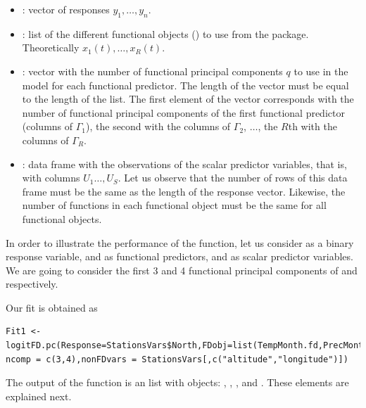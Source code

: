 \begin{itemize} 
\item {}: vector of responses $y_{1},\ldots ,y_{n}.$ 
\item {}: list of the different functional objects () to use from the  package. Theoretically $x_1(t),\ldots,x_R(t).$
\item {}: vector with the number of functional principal components $q$ to use in the model for each functional predictor. The length of the vector must be equal to the length of the  list. The first element of the vector corresponds with the number of functional principal components of the first functional predictor (columns of $\Gamma_1$), the second with the columns of $\Gamma_2$, $\ldots$, the $R$th with the columns of $\Gamma_R.$
\item {}: data frame with the observations of the scalar predictor variables, that is, with columns $U_1\ldots,U_S.$ Let us observe that the number of rows of this data frame must be the same as the length of the response vector. Likewise, the number of functions in each functional object must be the same for all functional objects.
\end{itemize} 

In order to illustrate the performance of the function, let us consider  as a binary response variable,  and  as functional predictors, and  as scalar predictor variables. We are going to consider the first 3 and 4 functional principal components of  and  respectively.

Our fit is obtained as

\begin{verbatim}
Fit1 <- logitFD.pc(Response=StationsVars$North,FDobj=list(TempMonth.fd,PrecMonth.fd),
ncomp = c(3,4),nonFDvars = StationsVars[,c("altitude","longitude")])
\end{verbatim}

The output of the function is an  list with objects: , , ,  and . These elements are explained next.

